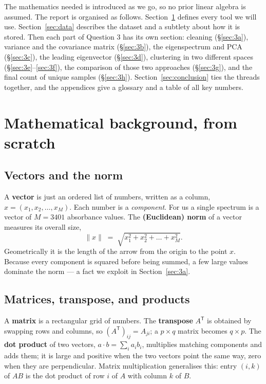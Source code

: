 \documentclass[11pt]{article}
\newcommand{\norm}[1]{\lVert #1 \rVert}
\newcommand{\T}{^{\mathsf{T}}}
\theoremstyle{definition}\newtheorem{definition}{Definition}[section]
\theoremstyle{plain}\newtheorem{proposition}{Proposition}[section]
\theoremstyle{remark}\newtheorem{remark}{Remark}[section]
\begin{document}
The mathematics needed is introduced as we go, so no prior linear algebra is assumed. The
report is organised as follows. Section~\ref{sec:background} defines every tool we will use.
Section~\ref{sec:data} describes the dataset and a subtlety about how it is stored. Then each
part of Question 3 has its own section: cleaning (\S\ref{sec:3a}), variance and the covariance
matrix (\S\ref{sec:3b}), the eigenspectrum and PCA (\S\ref{sec:3c}), the leading eigenvector
(\S\ref{sec:3d}), clustering in two different spaces (\S\ref{sec:3e}--\ref{sec:3f}), the
comparison of those two approaches (\S\ref{sec:3g}), and the final count of unique samples
(\S\ref{sec:3h}). Section~\ref{sec:conclusion} ties the threads together, and the appendices
give a glossary and a table of all key numbers.

\section{Mathematical background, from scratch}\label{sec:background}

\subsection{Vectors and the norm}
A \textbf{vector} is just an ordered list of numbers, written as a column,
$x=(x_1,x_2,\dots,x_M)$. Each number is a \emph{component}. For us a single spectrum is a
vector of $M=3401$ absorbance values. The \textbf{(Euclidean) norm} of a vector measures its
overall size,
\[
  \norm{x} \;=\; \sqrt{x_1^2 + x_2^2 + \dots + x_M^2}.
\]
Geometrically it is the length of the arrow from the origin to the point $x$. Because every
component is squared before being summed, a few large values dominate the norm --- a fact we
exploit in Section~\ref{sec:3a}.

\subsection{Matrices, transpose, and products}
A \textbf{matrix} is a rectangular grid of numbers. The \textbf{transpose} $A\T$ is obtained by
swapping rows and columns, so $(A\T)_{ij}=A_{ji}$; a $p\times q$ matrix becomes $q\times p$.
The \textbf{dot product} of two vectors, $a\cdot b=\sum_i a_ib_i$, multiplies matching
components and adds them; it is large and positive when the two vectors point the same way,
zero when they are perpendicular. Matrix multiplication generalises this: entry $(i,k)$ of
$AB$ is the dot product of row $i$ of $A$ with column $k$ of $B$.
\end{document}
